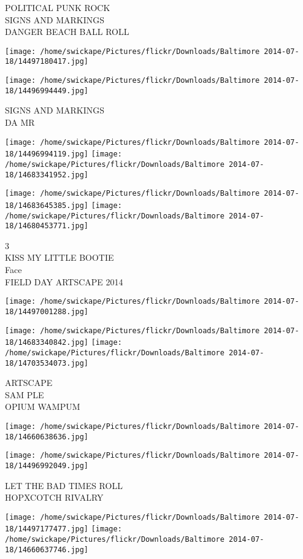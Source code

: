 \documentclass[10pt,letterpaper]{article}
\begin{document}
POLITICAL PUNK ROCK\\
SIGNS AND MARKINGS\\
DANGER BEACH BALL ROLL
\pagebreak

\texttt{[image: /home/swickape/Pictures/flickr/Downloads/Baltimore 2014-07-18/14497180417.jpg]}

\vspace{0.25in}
\texttt{[image: /home/swickape/Pictures/flickr/Downloads/Baltimore 2014-07-18/14496994449.jpg]}

SIGNS AND MARKINGS\\
DA MR
\pagebreak

\texttt{[image: /home/swickape/Pictures/flickr/Downloads/Baltimore 2014-07-18/14496994119.jpg]}
\texttt{[image: /home/swickape/Pictures/flickr/Downloads/Baltimore 2014-07-18/14683341952.jpg]}

\texttt{[image: /home/swickape/Pictures/flickr/Downloads/Baltimore 2014-07-18/14683645385.jpg]}
\texttt{[image: /home/swickape/Pictures/flickr/Downloads/Baltimore 2014-07-18/14680453771.jpg]}

3\\
KISS MY LITTLE BOOTIE\\
Face\\
FIELD DAY ARTSCAPE 2014
\pagebreak

\texttt{[image: /home/swickape/Pictures/flickr/Downloads/Baltimore 2014-07-18/14497001288.jpg]}

\vspace{0.25in}
\texttt{[image: /home/swickape/Pictures/flickr/Downloads/Baltimore 2014-07-18/14683340842.jpg]}
\texttt{[image: /home/swickape/Pictures/flickr/Downloads/Baltimore 2014-07-18/14703534073.jpg]}

ARTSCAPE\\
SAM PLE\\
OPIUM WAMPUM
\pagebreak

\texttt{[image: /home/swickape/Pictures/flickr/Downloads/Baltimore 2014-07-18/14660638636.jpg]}

\vspace{0.25in}
\texttt{[image: /home/swickape/Pictures/flickr/Downloads/Baltimore 2014-07-18/14496992049.jpg]}

LET THE BAD TIMES ROLL\\
HOPXCOTCH RIVALRY
\pagebreak

\texttt{[image: /home/swickape/Pictures/flickr/Downloads/Baltimore 2014-07-18/14497177477.jpg]}
\texttt{[image: /home/swickape/Pictures/flickr/Downloads/Baltimore 2014-07-18/14660637746.jpg]}
\end{document}
